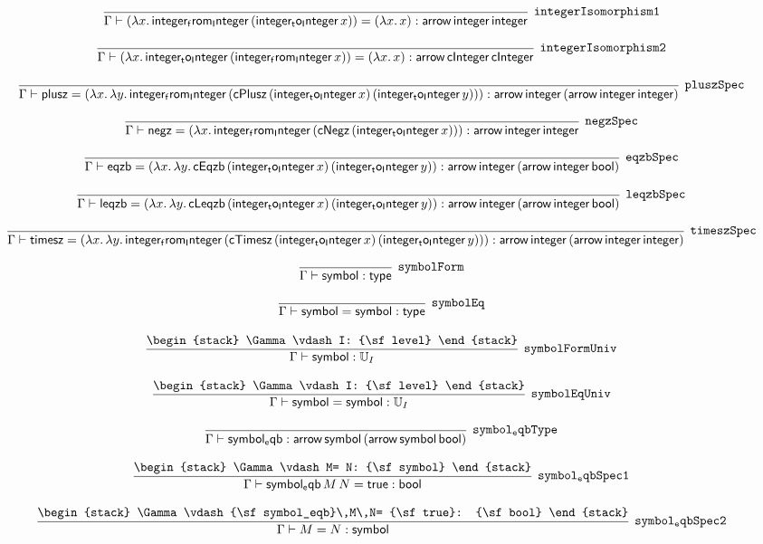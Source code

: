 \[
\infer[{\tt integerIsomorphism1}]{\Gamma \vdash (\lambda x.\,{\sf integer_from_Integer}\,({\sf integer_to_Integer}\,x))= (\lambda x.\,x): {\sf arrow}\,{\sf integer}\,{\sf integer}}{}
\]

\[
\infer[{\tt integerIsomorphism2}]{\Gamma \vdash (\lambda x.\,{\sf integer_to_Integer}\,({\sf integer_from_Integer}\,x))= (\lambda x.\,x): {\sf arrow}\,{\sf cInteger}\,{\sf cInteger}}{}
\]

\[
\infer[{\tt pluszSpec}]{\Gamma \vdash {\sf plusz}= (\lambda x.\,\lambda y.\,{\sf integer_from_Integer}\,({\sf cPlusz}\,({\sf integer_to_Integer}\,x)\,({\sf integer_to_Integer}\,y))): {\sf arrow}\,{\sf integer}\,({\sf arrow}\,{\sf integer}\,{\sf integer})}{}
\]

\[
\infer[{\tt negzSpec}]{\Gamma \vdash {\sf negz}= (\lambda x.\,{\sf integer_from_Integer}\,({\sf cNegz}\,({\sf integer_to_Integer}\,x))): {\sf arrow}\,{\sf integer}\,{\sf integer}}{}
\]

\[
\infer[{\tt eqzbSpec}]{\Gamma \vdash {\sf eqzb}= (\lambda x.\,\lambda y.\,{\sf cEqzb}\,({\sf integer_to_Integer}\,x)\,({\sf integer_to_Integer}\,y)): {\sf arrow}\,{\sf integer}\,({\sf arrow}\,{\sf integer}\,{\sf bool})}{}
\]

\[
\infer[{\tt leqzbSpec}]{\Gamma \vdash {\sf leqzb}= (\lambda x.\,\lambda y.\,{\sf cLeqzb}\,({\sf integer_to_Integer}\,x)\,({\sf integer_to_Integer}\,y)): {\sf arrow}\,{\sf integer}\,({\sf arrow}\,{\sf integer}\,{\sf bool})}{}
\]

\[
\infer[{\tt timeszSpec}]{\Gamma \vdash {\sf timesz}= (\lambda x.\,\lambda y.\,{\sf integer_from_Integer}\,({\sf cTimesz}\,({\sf integer_to_Integer}\,x)\,({\sf integer_to_Integer}\,y))): {\sf arrow}\,{\sf integer}\,({\sf arrow}\,{\sf integer}\,{\sf integer})}{}
\]

\[
\infer[{\tt symbolForm}]{\Gamma \vdash {\sf symbol}: {\sf type}}{}
\]

\[
\infer[{\tt symbolEq}]{\Gamma \vdash {\sf symbol}= {\sf symbol}: {\sf type}}{}
\]

\[
\infer[{\tt symbolFormUniv}]{\Gamma \vdash {\sf symbol}: {\Bbb U}_{I}}{
\begin{stack}
\Gamma \vdash I: {\sf level}
\end{stack}}
\]

\[
\infer[{\tt symbolEqUniv}]{\Gamma \vdash {\sf symbol}= {\sf symbol}: {\Bbb U}_{I}}{
\begin{stack}
\Gamma \vdash I: {\sf level}
\end{stack}}
\]

\[
\infer[{\tt symbol_eqbType}]{\Gamma \vdash {\sf symbol_eqb}: {\sf arrow}\,{\sf symbol}\,({\sf arrow}\,{\sf symbol}\,{\sf bool})}{}
\]

\[
\infer[{\tt symbol_eqbSpec1}]{\Gamma \vdash {\sf symbol_eqb}\,M\,N= {\sf true}: {\sf bool}}{
\begin{stack}
\Gamma \vdash M= N: {\sf symbol}
\end{stack}}
\]

\[
\infer[{\tt symbol_eqbSpec2}]{\Gamma \vdash M= N: {\sf symbol}}{
\begin{stack}
\Gamma \vdash {\sf symbol_eqb}\,M\,N= {\sf true}: {\sf bool}
\end{stack}}
\]

